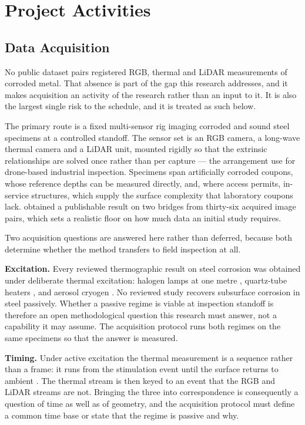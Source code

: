 \section{Project Activities}
\label{sec:project-activities}

\subsection{Data Acquisition}

No public dataset pairs registered RGB, thermal and LiDAR measurements of
corroded metal. That absence is part of the gap this research addresses, and it
makes acquisition an activity of the research rather than an input to it. It is
also the largest single risk to the schedule, and it is treated as such below.

The primary route is a fixed multi-sensor rig imaging corroded and sound steel
specimens at a controlled standoff. The sensor set is an RGB camera, a long-wave
thermal camera and a LiDAR unit, mounted rigidly so that the extrinsic
relationships are solved once rather than per capture --- the arrangement
\citet{Nooralishahi2022} use for drone-based industrial inspection. Specimens
span artificially corroded coupons, whose reference depths can be measured
directly, and, where access permits, in-service structures, which supply the
surface complexity that laboratory coupons lack. \citet{Lim2021} obtained a
publishable result on two bridges from thirty-six acquired image pairs, which
sets a realistic floor on how much data an initial study requires.

Two acquisition questions are answered here rather than deferred, because both
determine whether the method transfers to field inspection at all.

\textbf{Excitation.} Every reviewed thermographic result on steel corrosion was
obtained under deliberate thermal excitation: halogen lamps at one metre
\citep{Lim2021}, quartz-tube heaters \citep{Elizalde2023}, and aerosol cryogen
\citep{Doshvarpassand2022}. No reviewed study recovers subsurface corrosion in
steel passively. Whether a passive regime is viable at inspection standoff is
therefore an open methodological question this research must answer, not a
capability it may assume. The acquisition protocol runs both regimes on the same
specimens so that the answer is measured.

\textbf{Timing.} Under active excitation the thermal measurement is a sequence
rather than a frame: it runs from the stimulation event until the surface
returns to ambient \citep{Doshvarpassand2022}. The thermal stream is then keyed
to an event that the RGB and LiDAR streams are not. Bringing the three into
correspondence is consequently a question of time as well as of geometry, and
the acquisition protocol must define a common time base or state that the regime
is passive and why.

